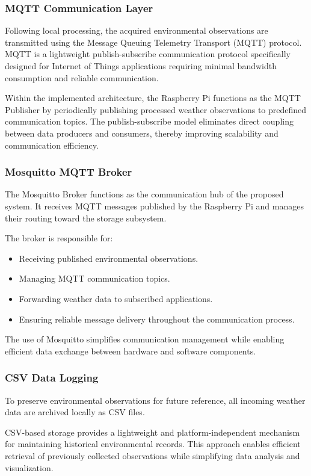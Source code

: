 \documentclass[12pt]{article}
\begin{document}
\subsubsection{MQTT Communication Layer}
Following local processing, the acquired environmental observations are transmitted using the Message Queuing Telemetry Transport (MQTT) protocol. MQTT is a lightweight publish-subscribe communication protocol specifically designed for Internet of Things applications requiring minimal bandwidth consumption and reliable communication.

Within the implemented architecture, the Raspberry Pi functions as the MQTT Publisher by periodically publishing processed weather observations to predefined communication topics. The publish-subscribe model eliminates direct coupling between data producers and consumers, thereby improving scalability and communication efficiency.

\subsubsection{Mosquitto MQTT Broker}
The Mosquitto Broker functions as the communication hub of the proposed system. It receives MQTT messages published by the Raspberry Pi and manages their routing toward the storage subsystem.

The broker is responsible for:
\begin{itemize}
    \item Receiving published environmental observations.
    \item Managing MQTT communication topics.
    \item Forwarding weather data to subscribed applications.
    \item Ensuring reliable message delivery throughout the communication process.
\end{itemize}
The use of Mosquitto simplifies communication management while enabling efficient data exchange between hardware and software components.

\subsubsection{CSV Data Logging}
To preserve environmental observations for future reference, all incoming weather data are archived locally as CSV files.

CSV-based storage provides a lightweight and platform-independent mechanism for maintaining historical environmental records. This approach enables efficient retrieval of previously collected observations while simplifying data analysis and visualization.
\end{document}
